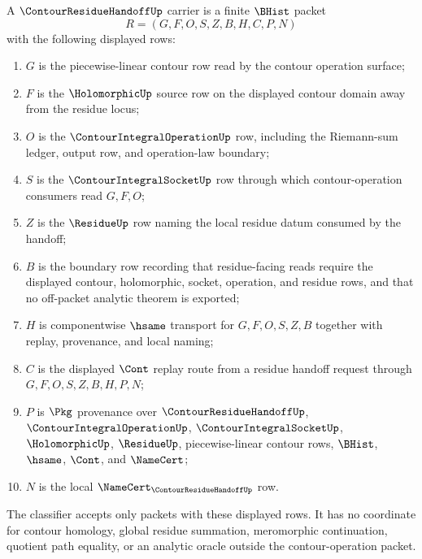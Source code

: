 \begin{definition}
\label{def:contour-residue-handoff-carrier}
A $\ContourResidueHandoffUp$ carrier is a finite $\BHist$ packet
$$
R=(G,F,O,S,Z,B,H,C,P,N)
$$
with the following displayed rows:
\begin{enumerate}
\item $G$ is the piecewise-linear contour row read by the contour operation surface;
\item $F$ is the $\HolomorphicUp$ source row on the displayed contour domain away from the residue locus;
\item $O$ is the $\ContourIntegralOperationUp$ row, including the Riemann-sum ledger, output row, and operation-law boundary;
\item $S$ is the $\ContourIntegralSocketUp$ row through which contour-operation consumers read $G,F,O$;
\item $Z$ is the $\ResidueUp$ row naming the local residue datum consumed by the handoff;
\item $B$ is the boundary row recording that residue-facing reads require the displayed contour, holomorphic, socket, operation, and residue rows, and that no off-packet analytic theorem is exported;
\item $H$ is componentwise $\hsame$ transport for $G,F,O,S,Z,B$ together with replay, provenance, and local naming;
\item $C$ is the displayed $\Cont$ replay route from a residue handoff request through $G,F,O,S,Z,B,H,P,N$;
\item $P$ is $\Pkg$ provenance over $\ContourResidueHandoffUp$, $\ContourIntegralOperationUp$, $\ContourIntegralSocketUp$, $\HolomorphicUp$, $\ResidueUp$, piecewise-linear contour rows, $\BHist$, $\hsame$, $\Cont$, and $\NameCert$;
\item $N$ is the local $\NameCert_{\ContourResidueHandoffUp}$ row.
\end{enumerate}
The classifier accepts only packets with these displayed rows. It has no coordinate for contour homology, global residue summation, meromorphic continuation, quotient path equality, or an analytic oracle outside the contour-operation packet.
\end{definition}

